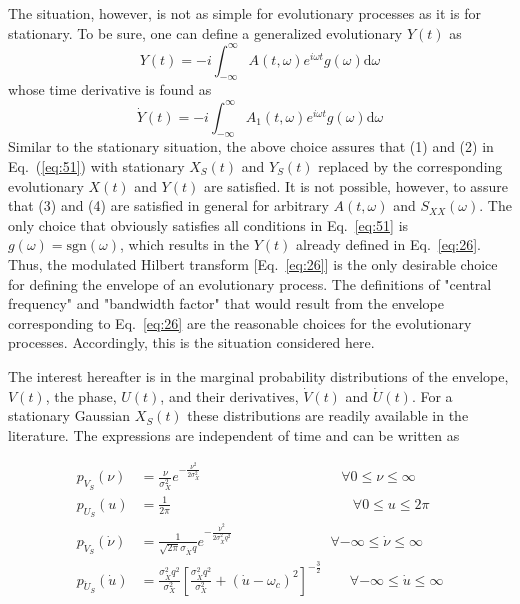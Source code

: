 \documentclass{article}
\begin{document}
The situation, however, is not as simple for evolutionary processes as it is
for stationary. To be sure, one can define a generalized evolutionary $Y (t)$
as
\begin{equation}
  Y (t) = - i \int_{- \infty}^{\infty} A (t, \omega) e^{i \omega t} g (\omega)
  \mathrm{d} \omega \label{eq:52}
\end{equation}
whose time derivative is found as
\begin{equation}
  \dot{Y} (t) = - i \int_{- \infty}^{\infty} A_1 (t, \omega) e^{i \omega t} g
  (\omega) \mathrm{d} \omega \label{eq:53}
\end{equation}
Similar to the stationary situation, the above choice assures that (1) and (2)
in Eq.~(\ref{eq:51}) with stationary $X_S (t)$ and $Y_S (t)$ replaced by the
corresponding evolutionary $X (t)$ and $Y (t)$ are satisfied. It is not
possible, however, to assure that (3) and (4) are satisfied in general for
arbitrary $A (t, \omega)$ and $S_{XX} (\omega)$. The only choice that
obviously satisfies all conditions in Eq.~\eqref{eq:51} is $g (\omega) =
\mathrm{sgn} (\omega)$, which results in the $Y (t)$ already defined in
Eq.~\eqref{eq:26}. Thus, the modulated Hilbert transform [Eq.~\eqref{eq:26}]
is the only desirable choice for defining the envelope of an evolutionary
process. The definitions of "central frequency" and "bandwidth factor" that
would result from the envelope corresponding to Eq.~\eqref{eq:26} are the
reasonable choices for the evolutionary processes. Accordingly, this is the
situation considered here.

The interest hereafter is in the marginal probability distributions of the
envelope, $V (t)$, the phase, $U (t)$, and their derivatives, $\dot{V} (t)$
and $\dot{U} (t)$. For a stationary Gaussian $X_S (t)$ these distributions are
readily available in the literature. The expressions are independent of time
and can be written as~{\cite{Sveshnikov1966}}

\begin{align}
  p_{V_S} (\nu) & = \frac{\nu}{\sigma_X^2} e^{- \frac{\nu^2}{2 \sigma_X^2}} 
  \hspace{10em} \forall 0 \leqslant \nu \leqslant \infty  \label{eq:54}\\
  p_{U_S} (u) & = \frac{1}{2 \pi}  \hspace{13em} \forall 0 \leqslant u
  \leqslant 2 \pi  \label{eq:55}\\
  p_{\dot{V}_S} (\dot{\nu}) & = \frac{1}{\sqrt{2 \pi} \sigma_{\dot{X}} q} e^{-
  \frac{\dot{\nu}^2}{2 \sigma_{\dot{X}}^2 q^2}} \hspace{7em} \forall - \infty
  \leqslant \dot{\nu} \leqslant \infty  \label{eq:56}\\
  p_{\dot{U}_S} (\dot{u}) & = \frac{\sigma_{\dot{X}}^2 q^2}{\sigma_X^2} 
  \left[ \frac{\sigma_{\dot{X}}^2 q^2}{\sigma_X^2} + (\dot{u} - \omega_c)^2
  \right]^{- \frac{3}{2}} \qquad \forall - \infty \leqslant \dot{u} \leqslant
  \infty  \label{eq:57}
\end{align}
\end{document}
